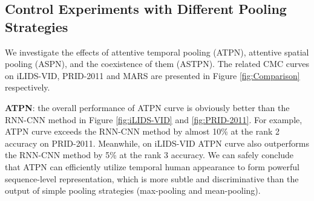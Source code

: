 \documentclass[10pt,twocolumn,letterpaper]{article}
\begin{document}

  



\subsection{Control Experiments with Different Pooling Strategies}

We investigate the effects of attentive temporal pooling (ATPN), attentive spatial pooling (ASPN), and the coexistence of them (ASTPN). The related CMC curves on iLIDS-VID, PRID-2011 and MARS are presented in Figure \ref{fig:Comparison} respectively. 

\textbf{ATPN}: the overall performance of ATPN curve is obviously better than the RNN-CNN method in Figure \ref{fig:iLIDS-VID} and \ref{fig:PRID-2011}. For example, ATPN curve exceeds the RNN-CNN method by almost 10\% at the rank 2 accuracy on PRID-2011. Meanwhile, on iLIDS-VID ATPN curve also outperforms the RNN-CNN method by 5\% at the rank 3 accuracy. We can safely conclude that ATPN can efficiently utilize temporal human appearance to form powerful sequence-level representation, which is more subtle and discriminative than the output of simple pooling strategies (max-pooling and mean-pooling).       
\end{document}
